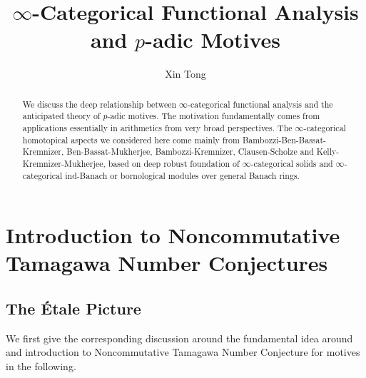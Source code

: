 \documentclass[11pt]{report}
\begin{document}
\title{$\infty$-Categorical Functional Analysis and $p$-adic Motives}
\author{Xin Tong}
\date{}


\maketitle



\begin{abstract}
We discuss the deep relationship between $\infty$-categorical functional analysis and the anticipated theory of $p$-adic motives. The motivation fundamentally comes from applications essentially in arithmetics from very broad perspectives. The $\infty$-categorical homotopical aspects we considered here come mainly from Bambozzi-Ben-Bassat-Kremnizer, Ben-Bassat-Mukherjee, Bambozzi-Kremnizer, Clausen-Scholze and Kelly-Kremnizer-Mukherjee, based on deep robust foundation of $\infty$-categorical solids and $\infty$-categorical ind-Banach or bornological modules over general Banach rings.
\end{abstract}



\tableofcontents


\chapter{Introduction to Noncommutative Tamagawa Number Conjectures}

\section{The \'Etale Picture}


\noindent We first give the corresponding discussion around the fundamental idea around and introduction to Noncommutative Tamagawa Number Conjecture for motives in the following.
	
\end{document}
